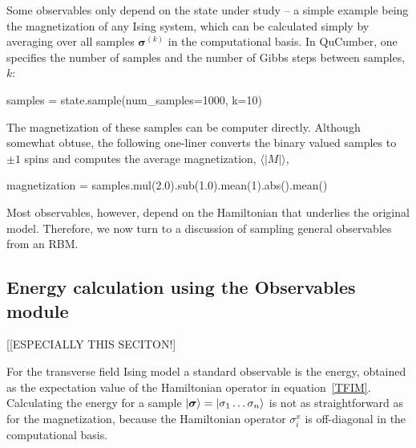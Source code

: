 \documentclass[submission, Phys]{SciPost}
\begin{document}
Some observables only depend on the state under study -- a simple example being the magnetization of any Ising 
system, which can be calculated simply by averaging over all samples $\bm{\sigma}^{(k)}$ in the computational basis.
In QuCumber, one specifies the number of samples and the number of Gibbs steps between samples, $k$:
\begin{python}
samples = state.sample(num_samples=1000, k=10)
\end{python}

The magnetization of these samples can be computer directly. Although somewhat obtuse, the following one-liner converts the binary valued samples to $\pm 1$ spins and computes the average magnetization, $\langle |M|\rangle$,
\begin{python}
magnetization = samples.mul(2.0).sub(1.0).mean(1).abs().mean()
\end{python}

Most observables, however, depend on the Hamiltonian that underlies the original model.
Therefore, we now turn to a discussion of sampling general observables from an RBM.


\subsection{Energy calculation using the Observables module}
[[ESPECIALLY THIS SECITON!] 

For the transverse field Ising model a standard observable is the energy, obtained as the expectation value of
the Hamiltonian operator in equation~\ref{TFIM}.
Calculating the energy for a sample $\ket{\bm{\sigma} }= \ket{\sigma_1 \dots \sigma_n}$ is not as straightforward as for the magnetization,
because the Hamiltonian operator ${\sigma}^x_i$ is off-diagonal in the computational basis.
\end{document}
